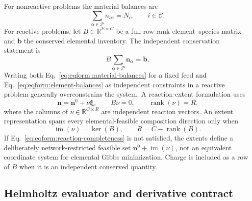 \documentclass[11pt]{article}
\newcommand{\R}{\mathbb{R}}
\newcommand{\rank}{\operatorname{rank}}
\begin{document}
For nonreactive problems the material balances are
\begin{equation}
 \sum_{\alpha\in\mathcal P} n_{i\alpha}=N_i,
 \qquad i\in\mathcal C.
\label{eq:eqform:material-balances}
\end{equation}
For reactive problems, let \(B\in\R^{E\times C}\) be a full-row-rank
element--species matrix and \(\boldsymbol b\) the conserved elemental
inventory. The independent conservation statement is
\begin{equation}
 B\sum_{\alpha\in\mathcal P}\boldsymbol n_\alpha=\boldsymbol b.
\label{eq:eqform:element-balances}
\end{equation}
Writing both Eq.~\eqref{eq:eqform:material-balances} for a fixed feed and
Eq.~\eqref{eq:eqform:element-balances} as independent constraints in a reactive
problem generally overconstrains the system. A reaction-extent formulation uses
\begin{equation}
 \boldsymbol n=\boldsymbol n^0+\nu\boldsymbol\xi,\qquad
 B\nu=0,\qquad \rank(\nu)=R.
\label{eq:eqform:reaction-extents}
\end{equation}
where the columns of \(\nu\in\R^{C\times R}\) are independent reaction vectors.
An extent representation spans every elemental-feasible composition direction
only when
\begin{equation}
 \operatorname{im}(\nu)=\ker(B),\qquad
 R=C-\rank(B).
\label{eq:eqform:reaction-completeness}
\end{equation}
If Eq.~\eqref{eq:eqform:reaction-completeness} is not satisfied, the extents
define a deliberately network-restricted feasible set
\(\boldsymbol n^0+\operatorname{im}(\nu)\), not an equivalent coordinate
system for elemental Gibbs minimization. Charge is included as a row of \(B\)
when it is an independent conserved quantity.

\subsection{Helmholtz evaluator and derivative contract}
\end{document}
